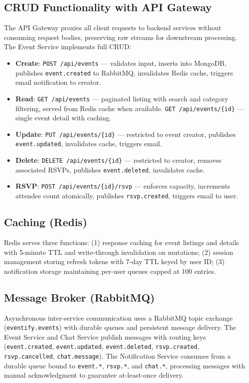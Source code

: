 \documentclass[12pt,a4paper]{article}
\begin{document}
\subsection{CRUD Functionality with API Gateway}

The API Gateway proxies all client requests to backend services without consuming request bodies, preserving raw streams for downstream processing. The Event Service implements full CRUD:

\begin{itemize}
    \item \textbf{Create}: \texttt{POST /api/events} --- validates input, inserts into MongoDB, publishes \texttt{event.created} to RabbitMQ, invalidates Redis cache, triggers email notification to creator.
    \item \textbf{Read}: \texttt{GET /api/events} --- paginated listing with search and category filtering, served from Redis cache when available. \texttt{GET /api/events/\{id\}} --- single event detail with caching.
    \item \textbf{Update}: \texttt{PUT /api/events/\{id\}} --- restricted to event creator, publishes \texttt{event.updated}, invalidates cache, triggers email.
    \item \textbf{Delete}: \texttt{DELETE /api/events/\{id\}} --- restricted to creator, removes associated RSVPs, publishes \texttt{event.deleted}, invalidates cache.
    \item \textbf{RSVP}: \texttt{POST /api/events/\{id\}/rsvp} --- enforces capacity, increments attendee count atomically, publishes \texttt{rsvp.created}, triggers email to user.
\end{itemize}

\subsection{Caching (Redis)}

Redis serves three functions: (1) response caching for event listings and details with 5-minute TTL and write-through invalidation on mutations; (2) session management storing refresh tokens with 7-day TTL keyed by user ID; (3) notification storage maintaining per-user queues capped at 100 entries.

\subsection{Message Broker (RabbitMQ)}

Asynchronous inter-service communication uses a RabbitMQ topic exchange (\texttt{eventify.events}) with durable queues and persistent message delivery. The Event Service and Chat Service publish messages with routing keys (\texttt{event.created}, \texttt{event.updated}, \texttt{event.deleted}, \texttt{rsvp.created}, \texttt{rsvp.cancelled}, \texttt{chat.message}). The Notification Service consumes from a durable queue bound to \texttt{event.*}, \texttt{rsvp.*}, and \texttt{chat.*}, processing messages with manual acknowledgment to guarantee at-least-once delivery.
\end{document}
